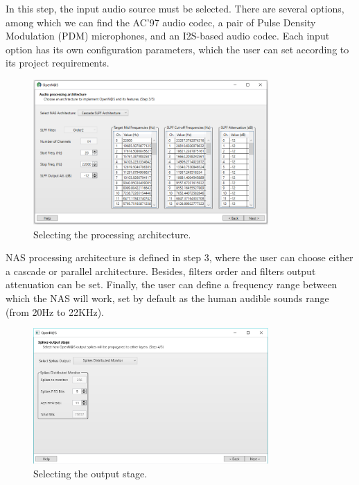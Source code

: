 In this step, the input audio source must be selected. There are several options, among which we can find the AC'97 audio codec, a pair of Pulse Density Modulation (PDM) microphones, and an I2S-based audio codec. Each input option has its own configuration parameters, which the user can set according to its project requirements.

\begin{figure}[H]
\centering
\includegraphics[width=0.8\textwidth]{images/Img20_S3_Arch.PNG}
\caption{\label{fig:wizard_overview_s3}Selecting the processing architecture.}
\end{figure}

NAS processing architecture is defined in step 3, where the user can choose either a cascade or parallel architecture. Besides, filters order and filters output attenuation can be set. Finally, the user can define a frequency range between which the NAS will work, set by default as the human audible sounds range (from 20Hz to 22KHz). 

\begin{figure}[H]
\centering
\includegraphics[width=0.8\textwidth]{images/Img22_S4_OutInterface.PNG}
\caption{\label{fig:wizard_overview_s4}Selecting the output stage.}
\end{figure}

